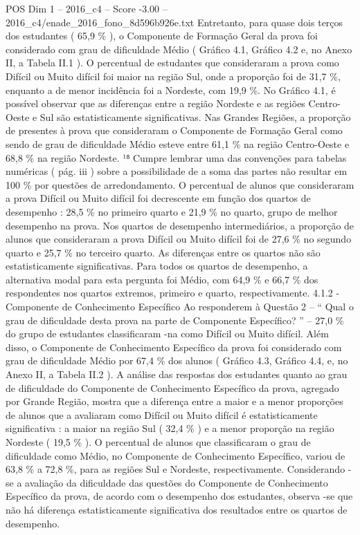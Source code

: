 \begin{textsample}{POS Dim 1 – 2016\_c4 – Score -3.00 – 2016\_c4/enade\_2016\_fono\_8d596b926e.txt}
Entretanto, para quase dois terços dos estudantes ( 65,9 \% ), o Componente de Formação Geral da prova foi considerado com grau de dificuldade Médio ( Gráfico 4.1, Gráfico 4.2 e, no Anexo II, a Tabela II.1 ).
O percentual de estudantes que consideraram a prova como Difícil ou Muito difícil foi maior na região Sul, onde a proporção foi de 31,7 \%, enquanto a de menor incidência foi a Nordeste, com 19,9 \%.
No Gráfico 4.1, é possível observar que as diferenças entre a região Nordeste e as regiões Centro-Oeste e Sul são estatisticamente significativas.
Nas Grandes Regiões, a proporção de presentes à prova que consideraram o Componente de Formação Geral como sendo de grau de dificuldade Médio esteve entre 61,1 \% na região Centro-Oeste e 68,8 \% na região Nordeste. ¹⁸ Cumpre lembrar uma das convenções para tabelas numéricas ( pág. iii ) sobre a possibilidade de a soma das partes não resultar em 100 \% por questões de arredondamento.
O percentual de alunos que consideraram a prova Difícil ou Muito difícil foi decrescente em função dos quartos de desempenho : 28,5 \% no primeiro quarto e 21,9 \% no quarto, grupo de melhor desempenho na prova.
Nos quartos de desempenho intermediários, a proporção de alunos que consideraram a prova Difícil ou Muito difícil foi de 27,6 \% no segundo quarto e 25,7 \% no terceiro quarto.
As diferenças entre os quartos não são estatisticamente significativas.
Para todos os quartos de desempenho, a alternativa modal para esta pergunta foi Médio, com 64,9 \% e 66,7 \% dos respondentes nos quartos extremos, primeiro e quarto, respectivamente. 4.1.2 - Componente de Conhecimento Específico Ao responderem à Questão 2 – “ Qual o grau de dificuldade desta prova na parte de Componente Específico? ” – 27,0 \% do grupo de estudantes classificaram -na como Difícil ou Muito difícil.
Além disso, o Componente de Conhecimento Específico da prova foi considerado com grau de dificuldade Médio por 67,4 \% dos alunos ( Gráfico 4.3, Gráfico 4.4, e, no Anexo II, a Tabela II.2 ).
A análise das respostas dos estudantes quanto ao grau de dificuldade do Componente de Conhecimento Específico da prova, agregado por Grande Região, mostra que a diferença entre a maior e a menor proporções de alunos que a avaliaram como Difícil ou Muito difícil é estatisticamente significativa : a maior na região Sul ( 32,4 \% ) e a menor proporção na região Nordeste ( 19,5 \% ).
O percentual de alunos que classificaram o grau de dificuldade como Médio, no Componente de Conhecimento Específico, variou de 63,8 \% a 72,8 \%, para as regiões Sul e Nordeste, respectivamente.
Considerando -se a avaliação da dificuldade das questões do Componente de Conhecimento Específico da prova, de acordo com o desempenho dos estudantes, observa -se que não há diferença estatisticamente significativa dos resultados entre os quartos de desempenho.

\end{textsample}
